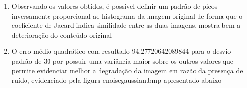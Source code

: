 \documentclass[10pt,a4paper]{article}
\begin{document}
\begin{enumerate}[label=\roman*.]
\item Observando os valores obtidos, é possível definir um padrão de picos inversamente proporcional ao histograma da imagem original de forma que o coeficiente de Jacard indica similidade entre as duas imagens, mostra bem a deterioração do conteúdo original

\begin{figure}[H]
    \centering
    \qquad
    \qquad
\end{figure}

\item O erro médio quadrático com resultado 94.27720642089844 para o desvio padrão de 30 por possuir uma variância maior sobre os outros valores que permite evidenciar melhor a degradação da imagem em razão da presença de ruído, evidenciado pela figura e\textunderscore noise\textunderscore gaussian.bmp apresentado abaixo


\end{enumerate}
\end{document}
